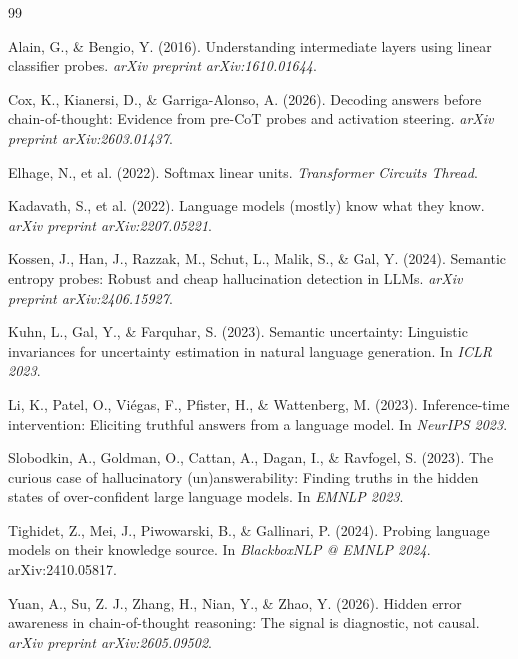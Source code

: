 \documentclass[11pt,twocolumn]{article}
\begin{document}
\begin{thebibliography}{99}

Alain, G., \& Bengio, Y. (2016).
Understanding intermediate layers using linear classifier probes.
\emph{arXiv preprint arXiv:1610.01644}.

Cox, K., Kianersi, D., \& Garriga-Alonso, A. (2026).
Decoding answers before chain-of-thought: Evidence from pre-{CoT} probes and activation
steering.
\emph{arXiv preprint arXiv:2603.01437}.

Elhage, N., et al. (2022).
Softmax linear units.
\emph{Transformer Circuits Thread}.

Kadavath, S., et al. (2022).
Language models (mostly) know what they know.
\emph{arXiv preprint arXiv:2207.05221}.

Kossen, J., Han, J., Razzak, M., Schut, L., Malik, S., \& Gal, Y. (2024).
Semantic entropy probes: Robust and cheap hallucination detection in {LLMs}.
\emph{arXiv preprint arXiv:2406.15927}.

Kuhn, L., Gal, Y., \& Farquhar, S. (2023).
Semantic uncertainty: Linguistic invariances for uncertainty estimation in natural
language generation.
In \emph{ICLR 2023}.

Li, K., Patel, O., Vi\'{e}gas, F., Pfister, H., \& Wattenberg, M. (2023).
Inference-time intervention: Eliciting truthful answers from a language model.
In \emph{NeurIPS 2023}.

Slobodkin, A., Goldman, O., Cattan, A., Dagan, I., \& Ravfogel, S. (2023).
The curious case of hallucinatory (un)answerability: Finding truths in the hidden
states of over-confident large language models.
In \emph{EMNLP 2023}.

Tighidet, Z., Mei, J., Piwowarski, B., \& Gallinari, P. (2024).
Probing language models on their knowledge source.
In \emph{BlackboxNLP @ EMNLP 2024}. arXiv:2410.05817.

Yuan, A., Su, Z. J., Zhang, H., Nian, Y., \& Zhao, Y. (2026).
Hidden error awareness in chain-of-thought reasoning: The signal is diagnostic,
not causal.
\emph{arXiv preprint arXiv:2605.09502}.

\end{thebibliography}
\end{document}
